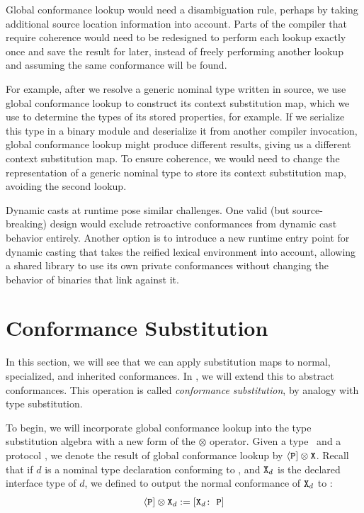 \documentclass[../generics]{subfiles}
\begin{document}
Global conformance lookup would need a disambiguation rule, perhaps by taking additional source location information into account. Parts of the compiler that require coherence would need to be redesigned to perform each lookup exactly once and save the result for later, instead of freely performing another lookup and assuming the same conformance will be found.

For example, after we resolve a generic nominal type written in source, we use global conformance lookup to construct its context substitution map, which we use to determine the types of its stored properties, for example. If we serialize this type in a binary module and deserialize it from another compiler invocation, global conformance lookup might produce different results, giving us a different context substitution map. To ensure coherence, we would need to change the representation of a generic nominal type to store its context substitution map, avoiding the second lookup.

Dynamic casts at runtime pose similar challenges. One valid (but source-breaking) design would exclude retroactive conformances from dynamic cast behavior entirely. Another option is to introduce a new runtime entry point for dynamic casting that takes the reified lexical environment into account, allowing a shared library to use its own private conformances without changing the behavior of binaries that link against it.

\section{Conformance Substitution}\label{conformance subst}

In this section, we will see that we can apply substitution maps to normal, specialized, and inherited conformances. In , we will extend this to abstract conformances. This operation is called \emph{conformance substitution}, by analogy with type substitution.

To begin, we will incorporate global conformance lookup into the type substitution algebra with a new form of the \index{$\otimes$}$\otimes$ operator. Given a type \tX\ and a protocol \tP, we denote the result of global conformance lookup by $\langle\texttt{P}] \otimes \texttt{X}$. Recall that if $d$ is a nominal type declaration conforming to \tP, and $\texttt{X}_d$ is the declared interface type of $d$, we defined  to output the normal conformance of $\texttt{X}_d$ to \tP:
\[\langle\texttt{P}]\otimes\texttt{X}_d := [\texttt{$\texttt{X}_d$:~P}]\]
\end{document}

